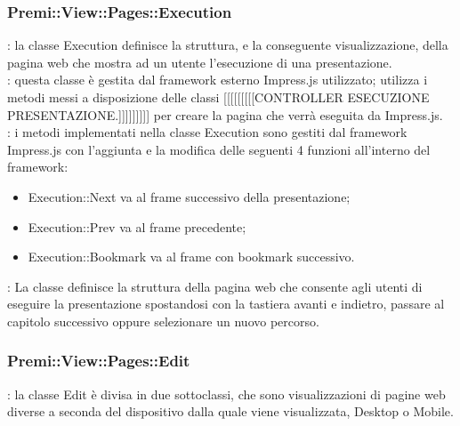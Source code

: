 {		\subsubsection{Premi::View::Pages::Execution}{
			\textbf{\tipo}: la classe Execution definisce la struttura, e la conseguente visualizzazione, della pagina web che mostra ad un utente l'esecuzione di una presentazione.\\
			\textbf{\relaz}: questa classe è gestita dal framework esterno Impress.js utilizzato; utilizza i metodi messi a disposizione delle classi [[[[[[[[[CONTROLLER ESECUZIONE PRESENTAZIONE.]]]]]]]]] per creare la pagina che verrà eseguita da Impress.js.\\
			\textbf{\interfacce}: i metodi implementati nella classe Execution sono gestiti dal framework Impress.js con l'aggiunta e la modifica delle seguenti 4 funzioni all'interno del framework:
			\begin{itemize}
				\item Execution::Next va al frame successivo della presentazione;
				\item Execution::Prev va al frame precedente;
				\item Execution::Bookmark va al frame con bookmark successivo.
			\end{itemize}
			\textbf{\attivita}: La classe definisce la struttura della pagina web che consente agli utenti di eseguire la presentazione spostandosi con la tastiera avanti e indietro, passare al capitolo successivo oppure selezionare un nuovo percorso.\\
		}
		\subsubsection{Premi::View::Pages::Edit}{
			\textbf{\tipo}: la classe Edit è divisa in due sottoclassi, che sono visualizzazioni di pagine web diverse a seconda del dispositivo dalla quale viene visualizzata, Desktop o Mobile.\\
		}
}

